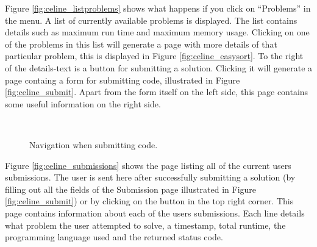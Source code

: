 Figure \ref{fig:celine_listproblems} shows what happens if you click on ``Problems'' in the menu. A list of currently available problems is displayed. The list contains details such as maximum run time and maximum memory usage. Clicking on one of the problems in this list will generate a page with more details of that particular problem, this is displayed in Figure \ref{fig:celine_easysort}. To the right of the details-text is a button for submitting a solution. Clicking it will generate a page containg a form for submitting code, illustrated in Figure \ref{fig:celine_submit}. Apart from the form itself on the left side, this page contains some useful information on the right side.

\begin{figure}[h]
\centering
\mbox{
}
\caption{Navigation when submitting code.}
\label{fig:celine_split_submit_submissions}
\end{figure}

Figure \ref{fig:celine_submissions} shows the page listing all of the current users submissions. The user is sent here after successfully submitting a solution (by filling out all the fields of the Submission page illustrated in Figure \ref{fig:celine_submit}) or by clicking on the button in the top right corner. This page contains information about each of the users submissions. Each line details what problem the user attempted to solve, a timestamp, total runtime, the programming language used and the returned status code. 



